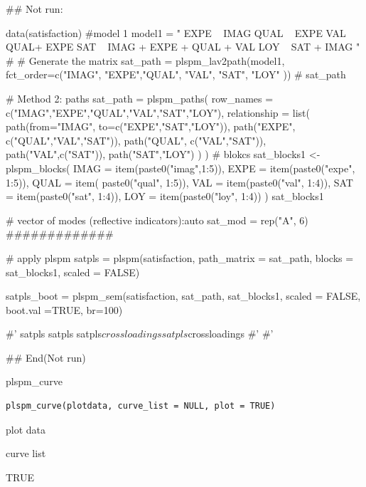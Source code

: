 \documentclass[a4paper]{book}
\begin{document}
\begin{Examples}
\begin{ExampleCode}


## Not run: 

data(satisfaction)
#model 1
model1 = "
EXPE ~ IMAG
QUAL ~ EXPE
VAL ~  QUAL+ EXPE
SAT ~ IMAG + EXPE + QUAL + VAL
LOY ~ SAT + IMAG
"
# # Generate the matrix
sat_path = plspm_lav2path(model1,
                          fct_order=c("IMAG", "EXPE","QUAL", "VAL", "SAT", "LOY" ))
# sat_path

# Method 2: paths
sat_path = plspm_paths(
  row_names = c("IMAG","EXPE","QUAL","VAL","SAT","LOY"),
  relationship = list(
    path(from="IMAG", to=c("EXPE","SAT","LOY")),
    path("EXPE", c("QUAL","VAL","SAT")),
    path("QUAL", c("VAL","SAT")),
    path("VAL",c("SAT")),
    path("SAT","LOY")
  )
)
# blokcs
sat_blocks1 <- plspm_blocks(
  IMAG = item(paste0("imag",1:5)),
  EXPE = item(paste0("expe", 1:5)),
  QUAL = item( paste0("qual", 1:5)),
  VAL = item(paste0("val", 1:4)),
  SAT = item(paste0("sat", 1:4)),
  LOY = item(paste0("loy", 1:4))
)
sat_blocks1

# vector of modes (reflective indicators):auto
sat_mod = rep("A", 6)
#############

# apply plspm
satpls = plspm(satisfaction,
                   path_matrix = sat_path,
                   blocks = sat_blocks1,
                   scaled = FALSE)

satpls_boot = plspm_sem(satisfaction, sat_path, sat_blocks1, scaled = FALSE,
                        boot.val =TRUE, br=100)


#'
satpls %
satpls %
satpls$crossloadings %
satpls$crossloadings %
#'
#'

## End(Not run)

\end{ExampleCode}
\end{Examples}
%
\begin{Description}
plspm\_curve
\end{Description}
%
\begin{Usage}
\begin{verbatim}
plspm_curve(plotdata, curve_list = NULL, plot = TRUE)
\end{verbatim}
\end{Usage}
%
\begin{Arguments}
\begin{ldescription}
\item[\code{plotdata}] plot data

\item[\code{curve\_list}] curve list

\item[\code{plot}] TRUE
\end{ldescription}
\end{Arguments}
\end{document}
